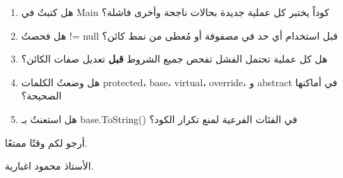 \documentclass[14pt]{extarticle}
\begin{document}
\filbreak
\begin{boxAttention}
\begin{enumerate}[itemsep=0.2em]
    \item هل كتبتُ في \textenglish{Main} كوداً يختبر كل عملية جديدة بحالات ناجحة وأخرى فاشلة؟
    \item هل فحصتُ \textenglish{!= null} قبل استخدام أي حد في مصفوفة أو مُعطى من نمط كائن؟
    \item هل كل عملية تحتمل الفشل تفحص جميع الشروط \textbf{قبل} تعديل صفات الكائن؟
    \item هل وضعتُ الكلمات \textenglish{protected}، \textenglish{base}، \textenglish{virtual}، \textenglish{override}، و \textenglish{abstract} في أماكنها الصحيحة؟
    \item هل استعنتُ بـ \textenglish{base.ToString()} في الفئات الفرعية لمنع تكرار الكود؟
\end{enumerate}
\end{boxAttention}

\begin{flushleft}
أرجو لكم وقتًا ممتعًا.

الأستاذ محمود اغبارية.
\end{flushleft}
\end{document}

